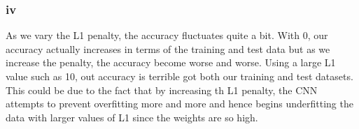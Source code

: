 \documentclass[11pt]{article} %
\begin{document}
\subsubsection{iv}
As we vary the L1 penalty,  the accuracy fluctuates quite a bit.  With 0, our accuracy actually increases in terms of the training and test data but as we increase the penalty,  the accuracy become worse and worse.  Using a large L1 value such as 10, out accuracy is terrible got both our training and test datasets. This could be due to the fact that by increasing th L1 penalty, the CNN attempts to prevent overfitting more and more and hence begins underfitting the data with larger values of L1 since the weights are so high.
\begin{figure}[h]
\centering
{}
\qquad
{}
\qquad
{}

\end{figure}
\end{document}
